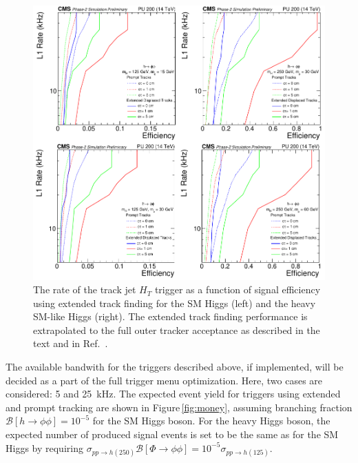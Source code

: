 \begin{figure}[hbtp]
  \centering
    \includegraphics{tex/figures/CMS-PAS-FTR-18-018_Figure_008.pdf}
    \caption{The rate of the track jet $H_T$ trigger as a function of signal efficiency using extended track finding for the SM Higgs (left) and the heavy SM-like Higgs (right). The extended track finding performance is extrapolated to the full outer tracker acceptance as described in the text and in Ref.~\cite{CMS:2018qgk}.}
    \label{fig:reff_dispextra}
\end{figure}

The available bandwith for the triggers described above, if implemented, will be decided as a part of the full trigger menu optimization.
Here, two cases are considered: 5 and 25~kHz. The expected event yield for triggers using extended and prompt tracking are shown in Figure\,\ref{fig:money},
assuming branching fraction $\mathcal{B}[\ensuremath{h \to \phi\phi}\xspace] = 10^{-5}$ for the SM Higgs boson.
For the heavy Higgs boson, the expected number of produced signal events is set to be the same as for the SM Higgs by requiring
$\sigma_{pp \to h(250)} \mathcal{B}[\ensuremath{\Phi \to \phi \phi}\xspace] = 10^{-5} \sigma_{pp \to h(125)}$.

